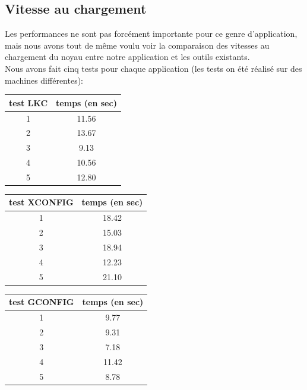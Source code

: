 \documentclass[17pts]{report}
\begin{document}
\subsection{Vitesse au chargement}
\label{sub:Vitesse au chargement}

Les performances ne sont pas forcément importante pour ce genre d'application,
mais nous avons tout de même voulu voir la comparaison des vitesses au
chargement du noyau entre notre application et les outils existants.\\

Nous avons fait cinq tests pour chaque application (les tests on été réalisé
sur des machines différentes):

\begin{tabular}{|c|c|}
\hline
test LKC & temps (en sec) \\
\hline
\hline
1 & 11.56 \\
\hline
2 & 13.67 \\
\hline
3 & 9.13 \\
\hline
4 & 10.56 \\
\hline
5 & 12.80 \\
\hline
\end{tabular}
\newline
\newline

\begin{tabular}{|c|c|}
\hline
test XCONFIG & temps (en sec) \\
\hline
\hline
1 & 18.42 \\
\hline
2 & 15.03 \\
\hline
3 & 18.94 \\
\hline
4 & 12.23 \\
\hline
5 & 21.10 \\
\hline
\end{tabular}
\newline
\newline

\begin{tabular}{|c|c|}
\hline
test GCONFIG & temps (en sec) \\
\hline
\hline
1 & 9.77 \\
\hline
2 & 9.31 \\
\hline
3 & 7.18 \\
\hline
4 & 11.42 \\
\hline
5 & 8.78 \\
\hline
\end{tabular}
\newline
\newline
\end{document}
